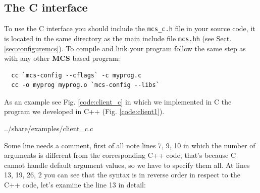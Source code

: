 \documentclass[12pt,titlepage]{article}
\newcommand{\mcs}{\textbf{MCS} }
\begin{document}

\subsection{The C interface}
\label{sec-The C interface}
To use the C interface you should include the \verb|mcs_c.h| file in
your source code, it is located in the same directory as the main
include file \verb|mcs.hh| (see Sect. \ref{sec:configuremcs}). To
compile and link your program follow the same step as with any other
\mcs based program:
%
\begin{verbatim}
  cc `mcs-config --cflags` -c myprog.c
  cc -o myprog myprog.o `mcs-config --libs`
\end{verbatim}

\noindent As an example see Fig. \ref{code:client_c} in which we
implemented in C the program we developed in C++
(Fig. \ref{code:client1}).


{../share/examples/client_c.c}
\normalsize

\medskip
\noindent Some line needs a comment, first of all note lines 7, 9, 10
in which the number of arguments is different from the corresponding
C++ code, that's because C cannot handle default argument values, so
we have to specify them all. At lines 13, 19, 26, 2 you can see that
the syntax is in reverse order in respect to the C++ code, let's
examine the line 13 in detail:
\end{document}
